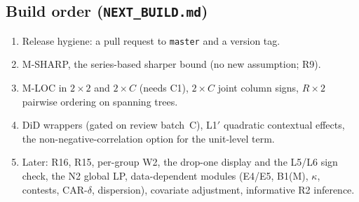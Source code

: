 \subsection{Build order (\texttt{NEXT\_BUILD.md})}

\begin{enumerate}[nosep]
\item Release hygiene: a pull request to \texttt{master} and a version tag.
\item M-SHARP, the series-based sharper bound (no new assumption; R9).
\item M-LOC in $2\times2$ and $2\times C$ (needs C1), $2\times C$ joint column
signs, $R\times2$ pairwise ordering on spanning trees.
\item DiD wrappers (gated on review batch~C), L1$'$ quadratic contextual effects,
the non-negative-correlation option for the unit-level term.
\item Later: R16, R15, per-group W2, the drop-one display and the L5/L6 sign check,
the N2 global LP, data-dependent modules (E4/E5, B1(M), $\kappa$, contests,
CAR-$\delta$, dispersion), covariate adjustment, informative R2 inference.
\end{enumerate}
